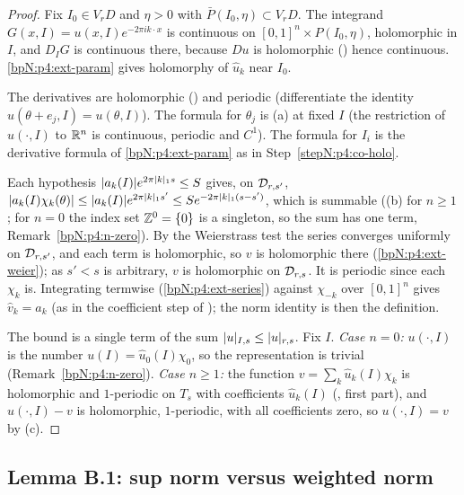 \begin{proof}
\label{stepN:p4:co-holo} Fix $I_0\in V_rD$ and $\eta>0$ with $\bar P(I_0,\eta)\subset V_rD$. The integrand $G(x,I)=u(x,I)e^{-2\pi ik\cdot x}$ is continuous on $[0,1]^n\times P(I_0,\eta)$, holomorphic in $I$, and
$D_IG$ is continuous there, because $Du$ is holomorphic () hence continuous. \ref{bpN:p4:ext-param} gives holomorphy of $\hat u_k$ near $I_0$.

\label{stepN:p4:co-deriv} The derivatives are holomorphic () and periodic (differentiate the identity $u(\theta+e_j,I)=u(\theta,I)$). The formula for $\theta_j$ is (a) at fixed $I$
(the restriction of $u(\cdot,I)$ to $\mathbb{R}^n$ is continuous, periodic and $C^1$). The formula for $I_i$ is the derivative formula of \ref{bpN:p4:ext-param} as in Step~\ref{stepN:p4:co-holo}.

\label{stepN:p4:co-series} Each hypothesis $\lvert a_k(I)\rvert e^{2\pi\lvert k\rvert_1s}\le S$ gives, on $\mathcal D_{r,s'}$, $\lvert a_k(I)\chi_k(\theta)\rvert\le\lvert a_k(I)\rvert e^{2\pi\lvert k\rvert_1s'}\le Se^{-2\pi\lvert k\rvert_1(s-s')}$, which is summable
((b) for $n\ge1$; for $n=0$ the index set $\mathbb{Z}^0=\{0\}$ is a singleton, so the sum has one term, Remark~\ref{bpN:p4:n-zero}). By the Weierstrass test the series converges uniformly on $\mathcal D_{r,s'}$, and each term is holomorphic, so $v$ is holomorphic there (\ref{bpN:p4:ext-weier}); as $s'<s$ is arbitrary, $v$ is holomorphic on $\mathcal D_{r,s}$.
It is periodic since each $\chi_k$ is. Integrating termwise (\ref{bpN:p4:ext-series}) against $\chi_{-k}$ over $[0,1]^n$ gives $\hat v_k=a_k$ (as in the coefficient step of ); the norm identity is then the definition.

\label{stepN:p4:co-repr} The bound is a single term of the sum $\lvert u\rvert_{I,s}\le\lvert u\rvert_{r,s}$. Fix $I$. \emph{Case $n=0$:} $u(\cdot,I)$ is the number $u(I)=\hat u_0(I)\chi_0$, so the representation is trivial (Remark~\ref{bpN:p4:n-zero}). \emph{Case $n\ge1$:} the function $v=\sum_k\hat u_k(I)\chi_k$ is holomorphic and $1$-periodic on $T_s$ with coefficients $\hat u_k(I)$ (, first part), and
$u(\cdot,I)-v$ is holomorphic, $1$-periodic, with all coefficients zero, so $u(\cdot,I)=v$ by (c).
\end{proof}

\subsection{Lemma B.1: sup norm versus weighted norm}\label{bpN:p4:s-b1}

